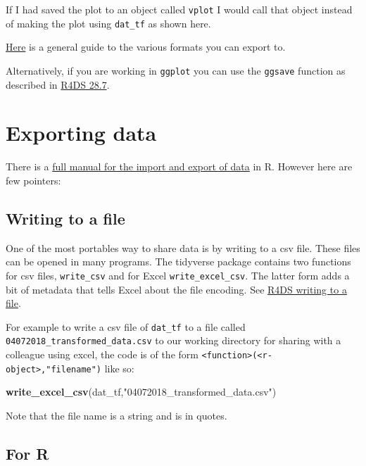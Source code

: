 \documentclass[12pt,]{book}
\newenvironment{Shaded}{\begin{snugshade}}{\end{snugshade}}
\newcommand{\KeywordTok}[1]{\textcolor[rgb]{0.13,0.29,0.53}{\textbf{#1}}}
\newcommand{\StringTok}[1]{\textcolor[rgb]{0.31,0.60,0.02}{#1}}
\newcommand{\NormalTok}[1]{#1}
\theoremstyle{definition}
\theoremstyle{definition}
\theoremstyle{definition}
\theoremstyle{remark}
\begin{document}
If I had saved the plot to an object called \texttt{vplot} I would call
that object instead of making the plot using \texttt{dat\_tf} as shown
here.

\href{https://www.stat.berkeley.edu/classes/s133/saving.html}{Here} is a
general guide to the various formats you can export to.

Alternatively, if you are working in \texttt{ggplot} you can use the
\texttt{ggsave} function as described in
\href{http://r4ds.had.co.nz/graphics-for-communication.html\#saving-your-plots}{R4DS
28.7}.

\section{Exporting data}\label{exporting-data}

There is a
\href{https://cran.r-project.org/doc/manuals/r-release/R-data.html}{full
manual for the import and export of data} in R. However here are few
pointers:

\subsection{Writing to a file}\label{writing-to-a-file}

One of the most portables way to share data is by writing to a csv file.
These files can be opened in many programs. The tidyverse package
contains two functions for csv files, \texttt{write\_csv} and for Excel
\texttt{write\_excel\_csv}. The latter form adds a bit of metadata that
tells Excel about the file encoding. See
\href{http://r4ds.had.co.nz/data-import.html\#writing-to-a-file}{R4DS
writing to a file}.

For example to write a csv file of \texttt{dat\_tf} to a file called
\texttt{04072018\_transformed\_data.csv} to our working directory for
sharing with a colleague using excel, the code is of the form
\texttt{\textless{}function\textgreater{}(\textless{}r-object\textgreater{},"filename")}
like so:

\begin{Shaded}
\begin{Highlighting}[]
\KeywordTok{write_excel_csv}\NormalTok{(dat_tf,}\StringTok{"04072018_transformed_data.csv"}\NormalTok{)}
\end{Highlighting}
\end{Shaded}

Note that the file name is a string and is in quotes.

\subsection{For R}\label{for-r}
\end{document}
